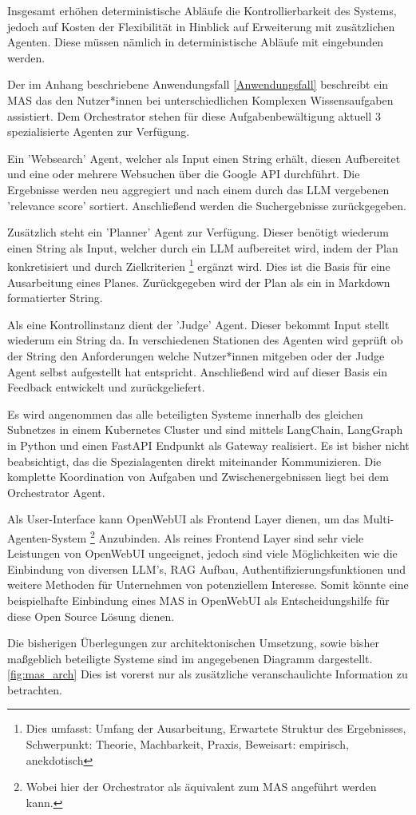 Insgesamt erhöhen deterministische Abläufe die Kontrollierbarkeit des Systems, jedoch auf Kosten der Flexibilität in Hinblick auf Erweiterung mit zusätzlichen Agenten. Diese müssen nämlich in deterministische Abläufe mit eingebunden werden. 

Der im Anhang beschriebene Anwendungsfall \ref{Anwendungsfall} beschreibt ein MAS das den Nutzer*innen bei unterschiedlichen Komplexen Wissensaufgaben assistiert. Dem Orchestrator stehen für diese Aufgabenbewältigung aktuell 3 spezialisierte Agenten zur Verfügung.

Ein 'Websearch' Agent, welcher als Input einen String erhält, diesen Aufbereitet und eine oder mehrere Websuchen über die Google API durchführt. Die Ergebnisse werden neu aggregiert und nach einem durch das LLM vergebenen 'relevance score' sortiert. Anschließend werden die Suchergebnisse zurückgegeben.

Zusätzlich steht ein 'Planner' Agent zur Verfügung. Dieser benötigt wiederum einen String als Input, welcher durch ein LLM aufbereitet wird, indem der Plan konkretisiert und durch Zielkriterien \footnote{Dies umfasst: Umfang der Ausarbeitung, Erwartete Struktur des Ergebnisses, Schwerpunkt: Theorie, Machbarkeit, Praxis, Beweisart: empirisch, anekdotisch} ergänzt wird. Dies ist die Basis für eine Ausarbeitung eines Planes. Zurückgegeben wird der Plan als ein in Markdown formatierter String.

Als eine Kontrollinstanz dient der 'Judge' Agent. Dieser bekommt Input stellt wiederum ein String da. In verschiedenen Stationen des Agenten wird geprüft ob der String den Anforderungen welche Nutzer*innen mitgeben oder der Judge Agent selbst aufgestellt hat entspricht. Anschließend wird auf dieser Basis ein Feedback entwickelt und zurückgeliefert.

Es wird angenommen das alle beteiligten Systeme innerhalb des gleichen Subnetzes in einem Kubernetes Cluster \cite{noauthor_produktionsreife_nodate} und sind mittels LangChain, LangGraph in Python \cite{chase_langchain_2022,noauthor_welcome_2026} und einen FastAPI \cite{ramirez_fastapi_2026} Endpunkt als Gateway realisiert. Es ist bisher nicht beabsichtigt, das die Spezialagenten direkt miteinander Kommunizieren. Die komplette Koordination von Aufgaben und Zwischenergebnissen liegt bei dem Orchestrator Agent.

Als User-Interface kann OpenWebUI \cite{noauthor_open-webuiopen-webui_2026} als Frontend Layer dienen, um das Multi-Agenten-System \footnote{Wobei hier der Orchestrator als äquivalent zum MAS angeführt werden kann.} Anzubinden. Als reines Frontend Layer sind sehr viele Leistungen von OpenWebUI  ungeeignet, jedoch sind viele Möglichkeiten wie die Einbindung von diversen LLM's, RAG Aufbau, Authentifizierungsfunktionen und weitere Methoden für Unternehmen von potenziellem Interesse. Somit könnte eine beispielhafte Einbindung eines MAS in OpenWebUI als Entscheidungshilfe für diese Open Source Lösung dienen.

Die bisherigen Überlegungen zur architektonischen Umsetzung, sowie bisher maßgeblich beteiligte Systeme sind im angegebenen Diagramm dargestellt. \ref{fig:mas_arch} Dies ist vorerst nur als zusätzliche veranschaulichte Information zu betrachten.
